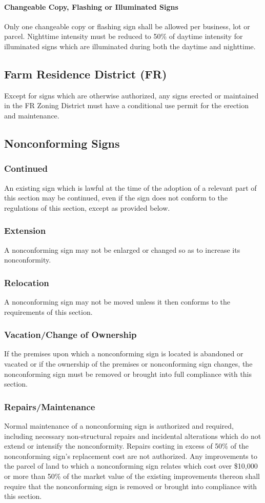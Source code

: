 \paragraph{Changeable Copy, Flashing or Illuminated Signs}
Only one changeable copy or flashing sign shall be allowed per business, lot or parcel. Nighttime intensity must be reduced to 50\% of daytime intensity for illuminated signs which are illuminated during both the daytime and nighttime.
\subsection{Farm Residence District (FR)}
Except for signs which are otherwise authorized, any signs erected or maintained in the FR Zoning District must have a conditional use permit for the erection and maintenance.
\subsection{Nonconforming Signs}
\subsubsection{Continued}
An existing sign which is lawful at the time of the adoption of a relevant part of this section may be continued, even if the sign does not conform to the regulations of this section, except as provided below.
\subsubsection{Extension}
A nonconforming sign may not be enlarged or changed so as to increase its nonconformity.
\subsubsection{Relocation}
A nonconforming sign may not be moved unless it then conforms to the requirements of this section.
\subsubsection{Vacation/Change of Ownership}
If the premises upon which a nonconforming sign is located is abandoned or vacated or if the ownership of the premises or nonconforming sign changes, the nonconforming sign must be removed or brought into full compliance with this section.
\subsubsection{Repairs/Maintenance}
Normal maintenance of a nonconforming sign is authorized and required, including necessary non-structural repairs and incidental alterations which do not extend or intensify the nonconformity. Repairs costing in excess of 50\% of the nonconforming sign’s replacement cost are not authorized. Any improvements to the parcel of land to which a nonconforming sign relates which cost over \$10,000 or more than 50\% of the market value of the existing improvements thereon shall require that the nonconforming sign is removed or brought into compliance with this section.
